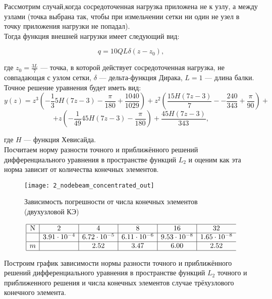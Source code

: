 \documentclass[12pt,a4paper]{article}
\begin{document}
Рассмотрим случай,когда сосредоточенная нагрузка приложена не к узлу, а между узлами (точка выбрана так, чтобы при измельчении сетки ни один не узел в точку приложения нагрузки не попадал).  \\

Тогда функция внешней нагрузки имеет следующий вид:

$$q = 10 Q L  \delta (z - z_{0}),$$

где $z_{0}=\frac{3L}{7}$ --- точка, в которой действует сосредоточенная нагрузка, не совпадающая с узлом сетки, $\delta$ --- дельта-функция Дирака, $L=1$ --- длина балки. \\

Точное решение уравнения будет иметь вид:
$$
	y(z)= z^3 \left(-\frac{1}{3} 5 H (7 z-3)-\frac{\pi }{180}+\frac{1040}{1029}\right)+z^2 \left(\frac{15 H (7 z-3)}{7}-
-\frac{240}{343}+\frac{\pi }{90}\right)+$$
$$+z \left(-\frac{1}{49} 45 H (7 z-3)-\frac{\pi }{180}\right)+\frac{45 H (7 z-3)}{343},
$$

где $H$ --- функция Хевисайда.\\

Посчитаем норму разности точного и приближённого решений дифференциального уравнения в пространстве функций $L_{2}$  и оценим как эта норма зависит от количества конечных элементов.\\

\begin{figure}[H]
		\centering
		\texttt{[image: 2\_nodebeam\_concentrated\_out]}
		\caption{Зависимость погрешности от числа конечных элементов (двухузловой КЭ)}
		\label{fig:2_nodebeam_concentrated_out}
	\end{figure}

\[
\begin{array}{|c|c|c|c|c|c}
\hline
\text{N} & 2 & 4 & 8 & 16 & 32\\ \hline
\Delta  &3.91 \cdot 10^{-4} & 6.72 \cdot 10^{-5} & 6.11 \cdot 10^{-6} & 9.53 \cdot 10^{-8} & 1.65 \cdot 10^{-8} \\ \hline
m  &  & 2.52 & 3.47 & 6.00 & 2.52 \\ 
\hline
\end{array}
\]

Построим график зависимости нормы разности точного и приближённого решений дифференциального уравнения в пространстве функций $L_{2}$ точного и приближенного решения и числа конечных элементов случае трёхузлового конечного элемента. 
\end{document}
